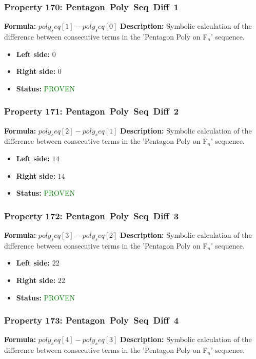 \subsubsection*{Property 170: Pentagon~Poly~Seq~Diff~1}
\textbf{Formula:} $poly_seq[1]-poly_seq[0]$
\textbf{Description:} Symbolic calculation of the difference between consecutive terms in the 'Pentagon Poly on F$_n$' sequence.

\begin{itemize}
\item \textbf{Left side:} $0$
\item \textbf{Right side:} $0$
\item \textbf{Status:} \textcolor{green}{PROVEN}
\end{itemize}

\subsubsection*{Property 171: Pentagon~Poly~Seq~Diff~2}
\textbf{Formula:} $poly_seq[2]-poly_seq[1]$
\textbf{Description:} Symbolic calculation of the difference between consecutive terms in the 'Pentagon Poly on F$_n$' sequence.

\begin{itemize}
\item \textbf{Left side:} $14$
\item \textbf{Right side:} $14$
\item \textbf{Status:} \textcolor{green}{PROVEN}
\end{itemize}

\subsubsection*{Property 172: Pentagon~Poly~Seq~Diff~3}
\textbf{Formula:} $poly_seq[3]-poly_seq[2]$
\textbf{Description:} Symbolic calculation of the difference between consecutive terms in the 'Pentagon Poly on F$_n$' sequence.

\begin{itemize}
\item \textbf{Left side:} $22$
\item \textbf{Right side:} $22$
\item \textbf{Status:} \textcolor{green}{PROVEN}
\end{itemize}

\subsubsection*{Property 173: Pentagon~Poly~Seq~Diff~4}
\textbf{Formula:} $poly_seq[4]-poly_seq[3]$
\textbf{Description:} Symbolic calculation of the difference between consecutive terms in the 'Pentagon Poly on F$_n$' sequence.

